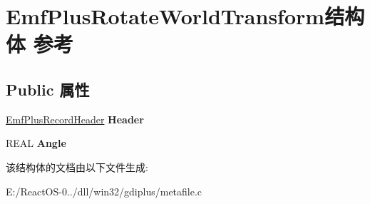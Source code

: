 \hypertarget{struct_emf_plus_rotate_world_transform}{}\section{Emf\+Plus\+Rotate\+World\+Transform结构体 参考}
\label{struct_emf_plus_rotate_world_transform}
\subsection*{Public 属性}
\begin{DoxyCompactItemize}
\item 
\mbox{\label{struct_emf_plus_rotate_world_transform_a59e9437ef90ec2f08e0e1aa14cf9f48a}} 
\hyperlink{struct_emf_plus_record_header}{Emf\+Plus\+Record\+Header} {\bfseries Header}
\item 
\mbox{\label{struct_emf_plus_rotate_world_transform_a7e03b3c1d6ce96594a11adc0fce312c8}} 
R\+E\+AL {\bfseries Angle}
\end{DoxyCompactItemize}


该结构体的文档由以下文件生成\+:\begin{DoxyCompactItemize}
\item 
E\+:/\+React\+O\+S-\/0../dll/win32/gdiplus/metafile.\+c\end{DoxyCompactItemize}
